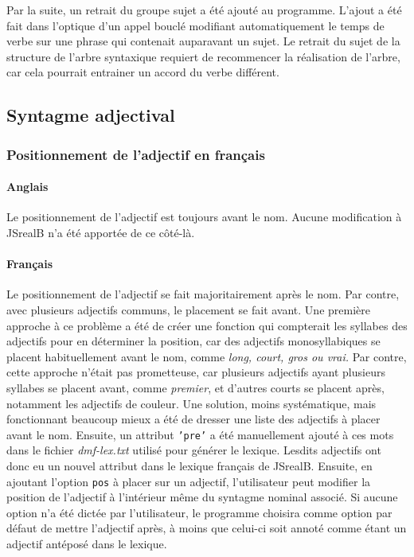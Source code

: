 \documentclass[11pt]{article} %
\newcommand{\system}[1]{\textsf{#1}}
\newcommand{\JSB}{\system{JSrealB}}
\begin{document}
Par la suite, un retrait du groupe sujet a été ajouté au programme.
L'ajout a été fait dans l'optique d'un appel bouclé modifiant automatiquement
le temps de verbe
sur une phrase qui contenait auparavant un sujet. Le retrait du sujet
de la structure de l'arbre syntaxique requiert de recommencer la réalisation
de l'arbre, car cela pourrait entrainer un accord du verbe différent.


\subsection{Syntagme adjectival}
\subsubsection{Positionnement de l'adjectif en français}
\paragraph{Anglais} Le positionnement de l'adjectif est toujours avant le nom. 
Aucune modification à \JSB{} n'a été apportée de ce côté-là.
\paragraph{Français}
Le positionnement de l'adjectif se fait majoritairement
après le nom. Par contre, avec plusieurs adjectifs communs, le placement
se fait avant.\cite[pp. 432-436]{gramGrevisse} Une première approche à ce problème a été de créer
une fonction qui compterait les syllabes des adjectifs pour en déterminer
la position, car des adjectifs monosyllabiques se placent habituellement
avant le nom, comme \emph{long, court, gros ou vrai.} Par contre,
cette approche n'était pas prometteuse, car plusieurs adjectifs ayant
plusieurs syllabes se placent avant, comme \emph{premier}, et d'autres
courts se placent après, notamment les adjectifs de couleur. Une solution,
moins systématique, mais fonctionnant beaucoup mieux a été de dresser
une liste des adjectifs à placer avant le nom. Ensuite, un attribut
\texttt{'pre'} a été manuellement ajouté à ces mots dans le fichier
\emph{dmf-lex.txt }utilisé pour générer le lexique. Lesdits adjectifs
ont donc eu un nouvel attribut dans le lexique français de \JSB{}.
Ensuite, en ajoutant l'option \texttt{pos} à placer sur un adjectif,
l'utilisateur peut modifier la position de l'adjectif à l'intérieur
même du syntagme nominal associé. Si aucune option n'a été dictée
par l'utilisateur, le programme choisira comme option par défaut de
mettre l'adjectif après, à moins que celui-ci soit annoté comme étant
un adjectif antéposé dans le lexique. 
\end{document}
